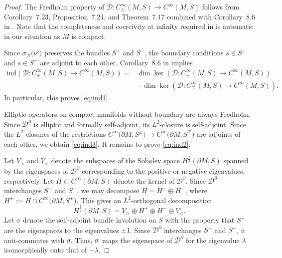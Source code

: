 \documentclass[pdftex]{sigma}
\numberwithin{equation}{section}
\begin{document}
\begin{proof}
The Fredholm property of $\mathcal{D}\colon C^\infty_\pm(M,S)\to C^\infty(M,S)$ follows from Corollary~7.23, Proposition~7.24, and Theorem~7.17 combined with Corollary~8.6 in \cite{Baer-Ballmann}.
Note that the completeness and coercivity at infinity required in \cite{Baer-Ballmann} is automatic in our situation as $M$ is compact.

Since $\sigma_{\mathcal{D}}\big(\nu^\flat\big)$ preserves the bundles $S^+$ and $S^-$, the boundary conditions $s\in S^+$ and $s\in S^-$ are adjoint to each other.
Corollary~8.6 in \cite{Baer-Ballmann} implies
\begin{align*}
\mathrm{ind}(\mathcal{D}\colon C^\infty_\pm(M,S)\to C^\infty(M,S))
={}&
\dim\ker(\mathcal{D}\colon C^\infty_\pm(M,S)\to C^\infty(M,S)) \\
& -
\dim\ker(\mathcal{D}\colon C^\infty_\mp(M,S)\to C^\infty(M,S)).
\end{align*}
In particular, this proves \eqref{eq:ind1}.

Elliptic operators on compact manifolds without boundary are always Fredholm.
Since $\mathcal{D}^\partial$ is elliptic and formally self-adjoint, its $L^2$-closure is self-adjoint.
Since the $L^2$-closures of the restrictions $C^\infty\big(\partial M,S^\pm\big)\to C^\infty\big(\partial M,S^\mp\big)$ are adjoints of each other, we obtain \eqref{eq:ind3}.
It remains to prove \eqref{eq:ind2}.

Let $V_>$ and $V_<$ denote the subspaces of the Sobolev space $H^{\frac{1}{2}}(\partial M,S)$ spanned by the eigenspaces of $\mathcal{D}^\partial$ corresponding to the positive or negative eigenvalues, respectively.
Let $H\subset C^\infty(\partial M,S)$ denote the kernel of $\mathcal{D}^\partial$.
Since $\mathcal{D}^\partial$ interchanges $S^+$ and $S^-$, we may decompose $H=H^+\oplus H^-$, where $H^\pm := H\cap C^\infty\big(\partial M,S^\pm\big)$.
This gives an $L^2$-orthogonal decomposition
\[
H^{\frac{1}{2}}(\partial M,S) = V_> \oplus H^+ \oplus H^- \oplus V_< .
\]
Let $\sigma$ denote the self-adjoint bundle involution on $S$ with the property that $S^\pm$ are the eigen\-spaces to the eigenvalues $\pm 1$.
Since $\mathcal{D}^\partial$ interchanges $S^+$ and $S^-$, it anti-commutes with $\sigma$.
Thus, $\sigma$~maps the eigenspace of $\mathcal{D}^\partial$ for the eigenvalue $\lambda$ isomorphically onto that of $-\lambda$.


\end{proof}
\end{document}

